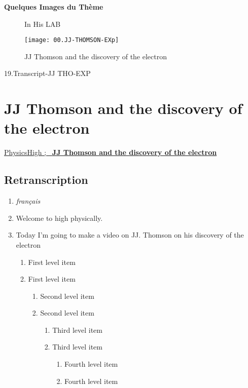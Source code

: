 \documentclass[../main.tex]{subfiles}
\begin{document}
\textbf{ Quelques Images du Thème}
    \begin{figure}[bh]
        \centering
                \caption{In His LAB}
        \texttt{[image: 00.JJ-THOMSON-EXp]} 
         \caption{JJ Thomson and the discovery of the electron}
        \label{fig:img1}
            \end{figure}
    19.Transcript-JJ THO-EXP
    
    
\section{JJ Thomson and the discovery of the electron}
\href{https://www.youtube.com/watch?v=GR9A7Hd4mxQ}{PhysicsHigh ; \ \textbf{JJ Thomson and the discovery of the electron}}\\

\subsection{Retranscription}
\begin{enumerate}
   \item \hspace*{.5cm} \emph{ français }
   \item Welcome to high physically.
   \item Today I'm going to make a video on JJ. Thomson on his discovery of the electron
    
    \begin{enumerate}
   \item First level item
   \item First level item
   \begin{enumerate}
     \item Second level item
     \item Second level item
     \begin{enumerate}
       \item Third level item
       \item Third level item
       \begin{enumerate}
         \item Fourth level item
         \item Fourth level item
       \end{enumerate}
     \end{enumerate}
   \end{enumerate}
 \end{enumerate}
     \end{enumerate}
    
\end{document}
